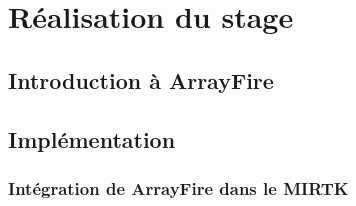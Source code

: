\documentclass[10pt]{report}
\begin{document}
\chapter{Réalisation du stage}
	\section{Introduction à ArrayFire}

	
	\section{Implémentation}
	\subsection{Intégration de ArrayFire dans le MIRTK} 
	
\end{document}
